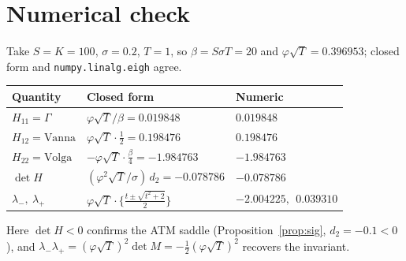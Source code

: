 \documentclass[11pt]{article}
\begin{document}
\section{Numerical check}
Take $S=K=100$, $\sigma=0.2$, $T=1$, so $\beta=S\sigma T=20$ and $\varphi\sqrt T=0.396953$; closed form
and \texttt{numpy.linalg.eigh} agree.
\begin{center}\small
\begin{tabular}{lll}
\toprule
Quantity & Closed form & Numeric \\
\midrule
$H_{11}=\Gamma$ & $\varphi\sqrt T/\beta=0.019848$ & $0.019848$\\
$H_{12}=\text{Vanna}$ & $\varphi\sqrt T\cdot\tfrac12=0.198476$ & $0.198476$\\
$H_{22}=\text{Volga}$ & $-\varphi\sqrt T\cdot\tfrac\beta4=-1.984763$ & $-1.984763$\\
$\det H$ & $(\varphi^2\sqrt T/\sigma)\,d_2=-0.078786$ & $-0.078786$\\
$\lambda_-,\ \lambda_+$ & $\varphi\sqrt T\cdot\{\tfrac{t\pm\sqrt{t^2+2}}2\}$ & $-2.004225,\ \ 0.039310$\\
\bottomrule
\end{tabular}
\end{center}
Here $\det H<0$ confirms the ATM saddle (Proposition~\ref{prop:sig}, $d_2=-0.1<0$), and
$\lambda_-\lambda_+=(\varphi\sqrt T)^2\det M=-\tfrac12(\varphi\sqrt T)^2$ recovers the invariant.
\end{document}
